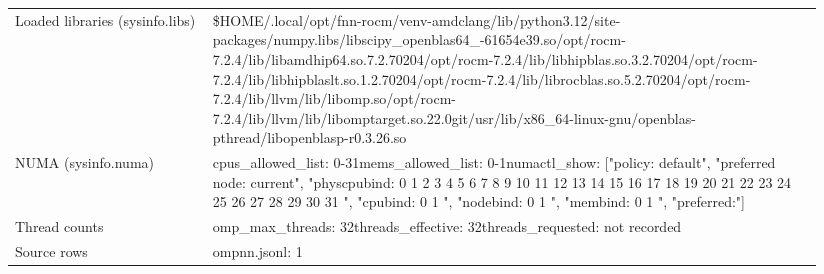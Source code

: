 \begin{longtable}{>{\raggedright\arraybackslash}p{0.23\linewidth}>{\raggedright\arraybackslash}p{0.71\linewidth}}
Loaded libraries (sysinfo.libs) & \$HOME/\allowbreak{}.local/\allowbreak{}opt/\allowbreak{}fnn-rocm/\allowbreak{}venv-amdclang/\allowbreak{}lib/\allowbreak{}python3.12/\allowbreak{}site-packages/\allowbreak{}numpy.libs/\allowbreak{}libscipy\_\allowbreak{}openblas64\_\allowbreak{}-61654e39.so\newline /\allowbreak{}opt/\allowbreak{}rocm-7.2.4/\allowbreak{}lib/\allowbreak{}libamdhip64.so.7.2.70204\newline /\allowbreak{}opt/\allowbreak{}rocm-7.2.4/\allowbreak{}lib/\allowbreak{}libhipblas.so.3.2.70204\newline /\allowbreak{}opt/\allowbreak{}rocm-7.2.4/\allowbreak{}lib/\allowbreak{}libhipblaslt.so.1.2.70204\newline /\allowbreak{}opt/\allowbreak{}rocm-7.2.4/\allowbreak{}lib/\allowbreak{}librocblas.so.5.2.70204\newline /\allowbreak{}opt/\allowbreak{}rocm-7.2.4/\allowbreak{}lib/\allowbreak{}llvm/\allowbreak{}lib/\allowbreak{}libomp.so\newline /\allowbreak{}opt/\allowbreak{}rocm-7.2.4/\allowbreak{}lib/\allowbreak{}llvm/\allowbreak{}lib/\allowbreak{}libomptarget.so.22.0git\newline /\allowbreak{}usr/\allowbreak{}lib/\allowbreak{}x86\_\allowbreak{}64-linux-gnu/\allowbreak{}openblas-pthread/\allowbreak{}libopenblasp-r0.3.26.so \\
NUMA (sysinfo.numa) & cpus\_\allowbreak{}allowed\_\allowbreak{}list: 0-31\newline mems\_\allowbreak{}allowed\_\allowbreak{}list: 0-1\newline numactl\_\allowbreak{}show: ["policy: default", "preferred node: current", "physcpubind: 0 1 2 3 4 5 6 7 8 9 10 11 12 13 14 15 16 17 18 19 20 21 22 23 24 25 26 27 28 29 30 31 ", "cpubind: 0 1 ", "nodebind: 0 1 ", "membind: 0 1 ", "preferred:"] \\
Thread counts & omp\_\allowbreak{}max\_\allowbreak{}threads: 32\newline threads\_\allowbreak{}effective: 32\newline threads\_\allowbreak{}requested: not recorded \\
Source rows & ompnn.jsonl: 1 \\
\end{longtable}
